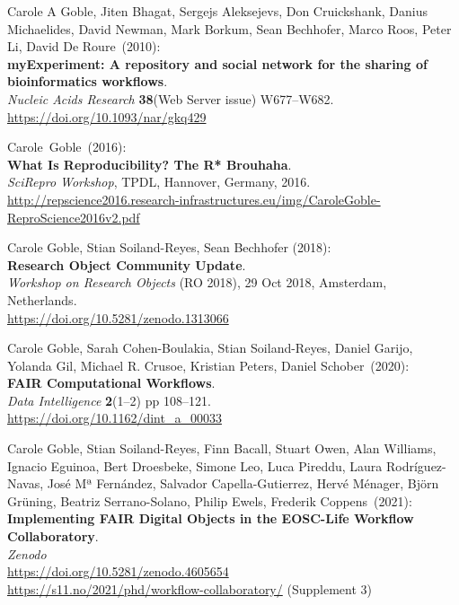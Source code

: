 \begin{thebibliography}{9}
Carole A Goble, Jiten Bhagat, Sergejs Aleksejevs, Don
Cruickshank, Danius Michaelides, David Newman, Mark Borkum, Sean
Bechhofer, Marco Roos, Peter Li, David De Roure~(2010):\\
\textbf{myExperiment: A repository and social network for the sharing of
bioinformatics workflows}.\\
\emph{Nucleic Acids Research} \textbf{38}(Web Server issue)
W677--W682.\\
\url{https://doi.org/10.1093/nar/gkq429}

Carole~Goble~(2016):\\
\textbf{What Is Reproducibility? The R* Brouhaha}.\\
\emph{SciRepro Workshop}, TPDL, Hannover, Germany, 2016.\\
\url{http://repscience2016.research-infrastructures.eu/img/CaroleGoble-ReproScience2016v2.pdf}

Carole Goble, Stian Soiland-Reyes, Sean Bechhofer (2018):\\
\textbf{Research Object Community Update}.\\
\emph{Workshop on Research Objects} (RO 2018), 29 Oct 2018, Amsterdam, Netherlands.\\
\url{https://doi.org/10.5281/zenodo.1313066}

Carole Goble, Sarah Cohen-Boulakia, Stian Soiland-Reyes, Daniel
Garijo, Yolanda Gil, Michael R. Crusoe, Kristian Peters, Daniel Schober~(2020):\\
\textbf{FAIR Computational Workflows}.\\
\emph{Data Intelligence} \textbf{2}(1--2) pp 108--121.\\
\url{https://doi.org/10.1162/dint_a_00033}

Carole Goble, Stian Soiland-Reyes, Finn Bacall, Stuart
Owen, Alan Williams, Ignacio Eguinoa, Bert Droesbeke, Simone Leo, Luca
Pireddu, Laura Rodríguez-Navas, José Mª Fernández, Salvador
Capella-Gutierrez, Hervé Ménager, Björn Grüning, Beatriz Serrano-Solano,
Philip Ewels, Frederik Coppens~(2021):\\
\textbf{Implementing FAIR Digital Objects in the EOSC-Life Workflow
Collaboratory}.\\
\emph{Zenodo}\\
\url{https://doi.org/10.5281/zenodo.4605654}\\
\url{https://s11.no/2021/phd/workflow-collaboratory/} (Supplement 3)


\end{thebibliography}
